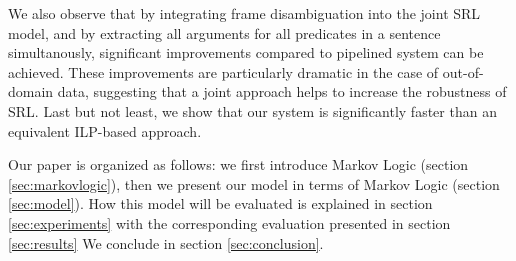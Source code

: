 We also observe that by integrating frame disambiguation into the
joint SRL model, and by extracting all arguments for all predicates in a
sentence simultanously, significant improvements compared to pipelined
system can be achieved. These improvements are particularly dramatic in
the case of out-of-domain data, suggesting that a joint approach helps
to increase the robustness of SRL.
Last but not least, we show that our system is significantly faster
than an equivalent ILP-based approach.

Our paper is organized as follows: we first introduce Markov Logic (section
\ref{sec:markovlogic}),
then we present our model in terms of Markov Logic (section \ref{sec:model}). How this model
will be evaluated is explained in section \ref{sec:experiments} with the corresponding
evaluation presented in section \ref{sec:results} We conclude in section
\ref{sec:conclusion}.


